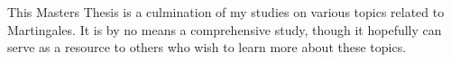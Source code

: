 \authorcontributions

This Masters Thesis is a culmination of my studies on various topics related to Martingales. It is by no means a comprehensive study, though it hopefully can serve as a resource to others who wish to learn more about these topics.